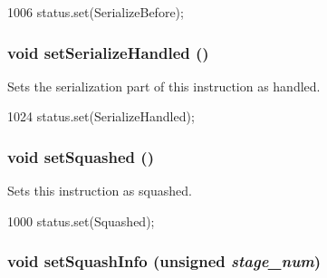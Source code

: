 \begin{DoxyCode}
1006 { status.set(SerializeBefore); }
\end{DoxyCode}
\hypertarget{classInOrderDynInst_ad115419b3ec6552a9db93ba349c73285}{
\subsubsection[{setSerializeHandled}]{\setlength{\rightskip}{0pt plus 5cm}void setSerializeHandled ()}}
\label{classInOrderDynInst_ad115419b3ec6552a9db93ba349c73285}
Sets the serialization part of this instruction as handled. 


\begin{DoxyCode}
1024 { status.set(SerializeHandled); }
\end{DoxyCode}
\hypertarget{classInOrderDynInst_abfa7b30b342b5ef70b7e060b305a2f94}{
\subsubsection[{setSquashed}]{\setlength{\rightskip}{0pt plus 5cm}void setSquashed ()}}
\label{classInOrderDynInst_abfa7b30b342b5ef70b7e060b305a2f94}
Sets this instruction as squashed. 


\begin{DoxyCode}
1000 { status.set(Squashed); }
\end{DoxyCode}
\hypertarget{classInOrderDynInst_aaed94af317e50d33bf94c74c423eabea}{
\subsubsection[{setSquashInfo}]{\setlength{\rightskip}{0pt plus 5cm}void setSquashInfo (unsigned {\em stage\_\-num})}}
\label{classInOrderDynInst_aaed94af317e50d33bf94c74c423eabea}



